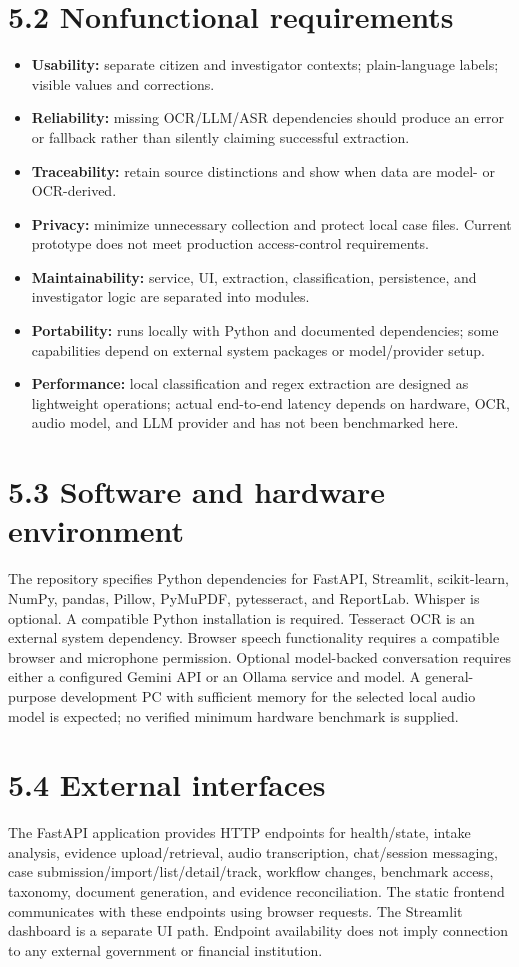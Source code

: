 \documentclass[12pt,a4paper,oneside]{report}
\begin{document}
\section{5.2 Nonfunctional requirements}
\begin{itemize}
\item \textbf{Usability:} separate citizen and investigator contexts; plain-language labels; visible values and corrections.
\item \textbf{Reliability:} missing OCR/LLM/ASR dependencies should produce an error or fallback rather than silently claiming successful extraction.
\item \textbf{Traceability:} retain source distinctions and show when data are model- or OCR-derived.
\item \textbf{Privacy:} minimize unnecessary collection and protect local case files. Current prototype does not meet production access-control requirements.
\item \textbf{Maintainability:} service, UI, extraction, classification, persistence, and investigator logic are separated into modules.
\item \textbf{Portability:} runs locally with Python and documented dependencies; some capabilities depend on external system packages or model/provider setup.
\item \textbf{Performance:} local classification and regex extraction are designed as lightweight operations; actual end-to-end latency depends on hardware, OCR, audio model, and LLM provider and has not been benchmarked here.
\end{itemize}
\section{5.3 Software and hardware environment}
The repository specifies Python dependencies for FastAPI, Streamlit, scikit-learn, NumPy, pandas, Pillow, PyMuPDF, pytesseract, and ReportLab. Whisper is optional. A compatible Python installation is required. Tesseract OCR is an external system dependency. Browser speech functionality requires a compatible browser and microphone permission. Optional model-backed conversation requires either a configured Gemini API or an Ollama service and model. A general-purpose development PC with sufficient memory for the selected local audio model is expected; no verified minimum hardware benchmark is supplied.

\section{5.4 External interfaces}
The FastAPI application provides HTTP endpoints for health/state, intake analysis, evidence upload/retrieval, audio transcription, chat/session messaging, case submission/import/list/detail/track, workflow changes, benchmark access, taxonomy, document generation, and evidence reconciliation. The static frontend communicates with these endpoints using browser requests. The Streamlit dashboard is a separate UI path. Endpoint availability does not imply connection to any external government or financial institution.
\end{document}
